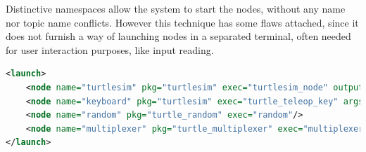 Distinctive namespaces allow the system to start the nodes, without any name nor topic name conflicts. However this technique has some flaws attached, since it does not furnish a way of launching nodes in a separated terminal, often needed for user interaction purposes, like input reading.




% 

\begin{lstlisting}[title={\texttt{TurtleSim} launch file. Note that topic remap is used to properly address the transmission of movement commands from both publishers.}, language=xml]
<launch>
    <node name="turtlesim" pkg="turtlesim" exec="turtlesim_node" output="screen" args="-r /turtle1/cmd_vel:=/main_topic"/>
    <node name="keyboard" pkg="turtlesim" exec="turtle_teleop_key" args="--ros-args -r /turtle1/cmd_vel:=/high_topic"/>
    <node name="random" pkg="turtle_random" exec="random"/>
    <node name="multiplexer" pkg="turtle_multiplexer" exec="multiplexer"/>
</launch>
\end{lstlisting}

